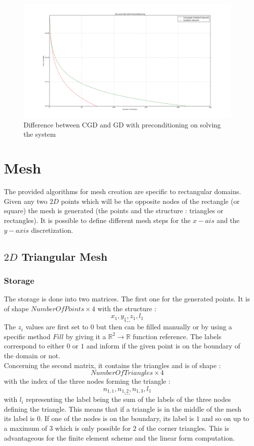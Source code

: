 \documentclass[a4paper]{report}
\begin{document}
\begin{figure}[H]
\begin{center}
\includegraphics[scale=0.20]{cgd_gd.png}\caption{Difference between CGD and GD with preconditioning on solving the system}
\end{center}
\end{figure}




\chapter{Mesh}
The provided algorithms for mesh creation are specific to rectangular domains. Given any two $2D$ points which will be the opposite nodes of the rectangle (or square) the mesh is generated (the points and the structure : triangles or rectangles). It is possible to define different mesh steps for the $x-ais$ and the $y-axis$ discretization.
\section{$2D$ Triangular Mesh}
\subsection{Storage}
The storage is done into two matrices. The first one for the generated points. It is of shape $NumberOfPoints \times 4$ with the structure :
\[
x_1,y_1,z_1,l_1
\]
\[
\dots
\]
The $z_i$ values are first set to $0$ but then can be filled manually or by using a specific method $Fill$ by giving it a $\mathbb{R}^2 \rightarrow \mathbb{R}$ function reference. The labels correspond to either $0$ or $1$ and inform if the given point is on the boundary of the domain or not.
\\
Concerning the second matrix, it contains the triangles and is of shape :
\[
NumberOfTriangles \times 4
\]
with the index of the three nodes forming the triangle :
\[
n_{1,1}, n_{1,2}, n_{1,3}, l_1
\]
\[...\]
with $l_i$ representing the label being the sum of the labels of the three nodes defining the triangle. This means that if a triangle is in the middle of the mesh its label is $0$. If one of the nodes is on the boundary, its label is $1$ and so on up to a maximum of $3$ which is only possible for $2$ of the corner triangles. This is advantageous for the finite element scheme and the linear form computation.
\end{document}
